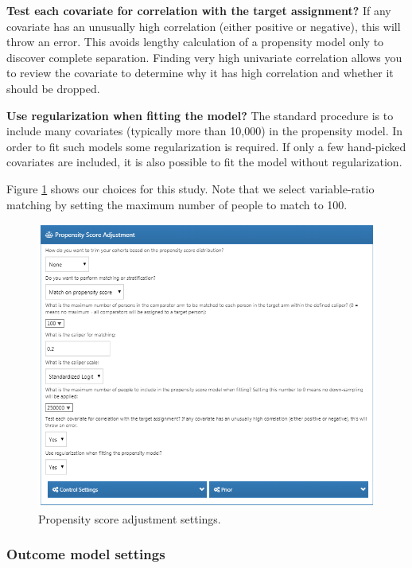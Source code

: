 \documentclass[11pt]{book}
\theoremstyle{definition}
\theoremstyle{definition}
\theoremstyle{definition}
\theoremstyle{remark}
\begin{document}
\textbf{Test each covariate for correlation with the target assignment?} If any covariate has an unusually high correlation (either positive or negative), this will throw an error. This avoids lengthy calculation of a propensity model only to discover complete separation. Finding very high univariate correlation allows you to review the covariate to determine why it has high correlation and whether it should be dropped.

\textbf{Use regularization when fitting the model?} The standard procedure is to include many covariates (typically more than 10,000) in the propensity model. In order to fit such models some regularization is required. If only a few hand-picked covariates are included, it is also possible to fit the model without regularization.

Figure \ref{fig:psSettings} shows our choices for this study. Note that we select variable-ratio matching by setting the maximum number of people to match to 100.

\begin{figure}

{\centering \includegraphics[width=1\linewidth]{images/PopulationLevelEstimation/psSettings} 

}

\caption{Propensity score adjustment settings.}\label{fig:psSettings}
\end{figure}

\hypertarget{outcome-model-settings}{%
\subsubsection*{Outcome model settings}\label{outcome-model-settings}}
\end{document}
